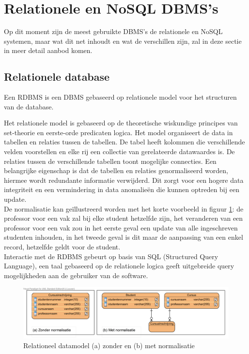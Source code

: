 \section{Relationele en NoSQL DBMS's} 
Op dit moment zijn de meest gebruikte DBMS's de relationele en NoSQL systemen, maar wat dit net inhoudt en wat de verschillen zijn, zal in deze sectie in meer detail aanbod komen. 

\subsection{Relationele database}
Een RDBMS is een DBMS gebaseerd op relationele model voor het structuren van de database.

Het relationele model is gebaseerd op de theoretische wiskundige principes van set-theorie en eerste-orde predicaten logica. Het model organiseert de data in tabellen en relaties tussen de tabellen. De tabel heeft kolommen die verschillende velden voorstellen en elke rij een collectie van gerelateerde datawaardes is. De relaties tussen de verschillende tabellen toont mogelijke connecties. Een belangrijke eigenschap is dat de tabellen en relaties genormaliseerd worden, hiermee wordt redundante informatie verwijderd. Dit zorgt voor een hogere data integriteit en een vermindering in data anomalieën die kunnen optreden bij een update.\cite{Elmasri:2010:FDS:1855347} \\
De normalisatie kan geïllustreerd worden met het korte voorbeeld in figuur \ref{fig:Relationeel-Model-Normalisatie}: de professor voor een vak zal bij elke student hetzelfde zijn, het veranderen van een professor voor een vak zou in het eerste geval een update van alle ingeschreven studenten inhouden, in het tweede geval is dit maar de aanpassing van een enkel record, hetzelfde geldt voor de student. \\
Interactie met de RDBMS gebeurt op basis van SQL (Structured Query Language), een taal gebaseerd op de relationele logica geeft uitgebreide query mogelijkheden aan de gebruiker van de software.   
\begin{figure}[ht!]
\centering
\includegraphics[width=\linewidth]{img/Relationeel-Model-Normalisatie.png}
\caption[Relationeel datamodel (a) zonder en (b) met normalisatie]{Relationeel datamodel (a) zonder en (b) met normalisatie}
\label{fig:Relationeel-Model-Normalisatie}
\end{figure}

